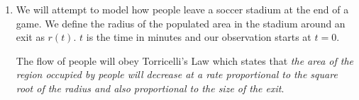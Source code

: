 \begin{enumerate}
\item We will attempt to model how people leave a soccer stadium at the end of a game. We define the radius of the populated area in the stadium around an exit as $r(t)$. $t$ is the time in minutes and our observation starts at $t=0$.
	
	The flow of people will obey Torricelli’s Law which states that \textit{the area of the region occupied by people will decrease at a rate proportional to the square root of the radius and also proportional to the size of the exit}.
	
\end{enumerate}
